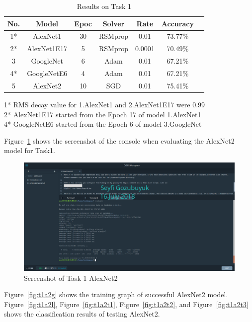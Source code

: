 \documentclass[10pt,journal,compsoc]{IEEEtran}
\begin{document}
\begin{table}[h]
\caption{Results on Task 1}
\label{table:t1r}
\begin{center}
\begin{tabular}{|c||c||c||c||c||c||c|}
\hline
No. & Model & Epoc & Solver & Rate & Accuracy \\
\hline
1* & AlexNet1 & 30 & RSMprop & 0.01 & 73.77\%\\
\hline
2* & AlexNet1E17 & 5 & RSMprop & 0.0001 & 70.49\%\\
\hline
3 & GoogleNet & 6 & Adam & 0.01 & 67.21\%\\
\hline
4* & GoogleNetE6 & 4 & Adam & 0.01 & 67.21\%\\
\hline
5 & AlexNet2 & 10 & SGD & 0.01 & 75.41\%\\
\hline
\end{tabular}
\end{center}
1* RMS decay value for 1.AlexNet1 and 2.AlexNet1E17 were 0.99\\
2* AlexNet1E17 started from the Epoch 17 of model 1.AlexNet1\\
4* GoogleNetE6 started from the Epoch 6 of model 3.GoogleNet
\end{table}

Figure~\ref{fig:t1a2c} shows the screenshot of the console when evaluating the AlexNet2 model for Task1.

\begin{figure}[thpb]
      \centering
      \includegraphics[width=\linewidth]{figures/t1a2c.png}
      \caption{Screenshot of Task 1 AlexNet2}
      \label{fig:t1a2c}
\end{figure}

Figure~\ref{fig:t1a2g} shows the training graph of successful AlexNet2 model. Figure~\ref{fig:t1a2l}, Figure~\ref{fig:t1a2t1}, Figure~\ref{fig:t1a2t2}, and Figure~\ref{fig:t1a2t3} shows the classification results of testing AlexNet2.
\end{document}
